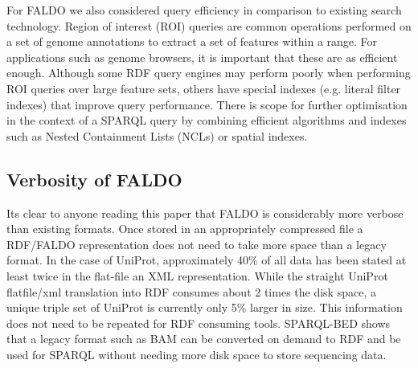 For FALDO we also considered query efficiency in comparison to existing search technology. 
Region of interest (ROI) queries are common operations performed on a
set of genome annotations to extract a set of features within a range.
For applications such as genome browsers, it is important that these are as efficient enough.
Although some RDF query engines may perform poorly when performing ROI queries over large feature sets,
others have special indexes (e.g. literal filter indexes) that improve query performance.
There is scope for further optimisation in the context of a SPARQL query by combining
efficient algorithms and indexes such as Nested Containment Lists (NCLs) \cite{NCL2007}
or spatial indexes.

\subsection*{Verbosity of FALDO}

Its clear to anyone reading this paper that FALDO is considerably more verbose than existing formats.
Once stored in an appropriately compressed file a RDF/FALDO representation does not need to take more space than a legacy format.
In the case of UniProt, approximately 40\% of all data has been stated at least twice in the flat-file an XML representation.
While the straight UniProt flatfile/xml translation into RDF consumes about 2 times the disk space, a unique triple
set of UniProt is currently only 5\% larger in size.
This information does not need to be repeated for RDF consuming tools.
SPARQL-BED shows that a legacy format such as BAM can be converted on demand to RDF and be used for SPARQL without needing more disk space to store sequencing data.






